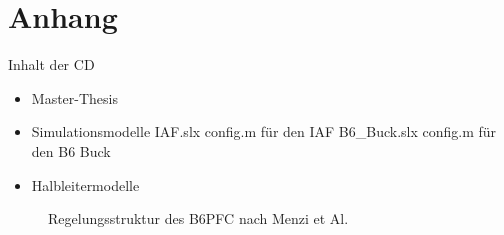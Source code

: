 \chapter{Anhang}
\setcounter{figure}{0}
\renewcommand{\thefigure}{A\arabic{figure}}

\setcounter{table}{0}
\renewcommand{\thetable}{A\arabic{table}}

\begin{table}
\caption{Inhalt der CD}
\begin{itemize}
	\item Master-Thesis
	\item Simulationsmodelle
		\subitem IAF.slx
		\subitem config.m für den IAF
		\subitem B6\_Buck.slx
		\subitem config.m für den B6 Buck
	
	\item Halbleitermodelle
	
\end{itemize}

\end{table}

\begin{figure}
	\centering
	\caption{Regelungsstruktur des \gls{B6PFC} nach Menzi et Al. \cite{13PWMPFC}}
	\label{fig:b6regelung}
\end{figure}

